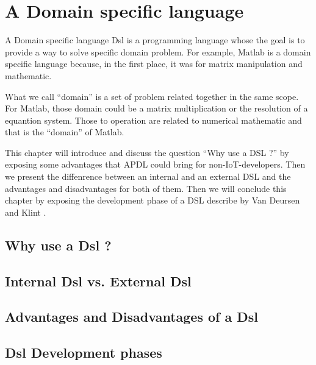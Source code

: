 \chapter{A Domain specific language}
\label{cha:a-dsl}

A Domain specific language \gls{Dsl} is a programming language whose the goal is
to provide a way to solve specific domain problem. For example, Matlab is a
domain specific language because, in the first place, it was for matrix
manipulation and mathematic.

What we call ``domain'' is a set of problem related together in the same scope.
For Matlab, those domain could be a matrix multiplication or the resolution of a
equantion system. Those to operation are related to numerical mathematic and
that is the ``domain'' of Matlab.

This chapter will introduce and discuss the question ``Why use a DSL ?'' by
exposing some advantages that \gls{APDL} could bring for non-IoT-developers.
Then we present the diffenrence between an internal and an external DSL and the
advantages and disadvantages for both of them. Then we will conclude this
chapter by exposing the development phase of a DSL describe by Van Deursen and
Klint \cite{little_languages_little_maintenance}.

\section{Why use a Dsl ?}
\label{sec:why-use-dsl}

\section{Internal Dsl vs. External Dsl}
\label{sec:dsl-internal-vs-external}

\section{Advantages and Disadvantages of a Dsl}
\label{sec:dsl-advantages-disadvantages}

\section{Dsl Development phases}
\label{sec:dsl-dev-phases}

